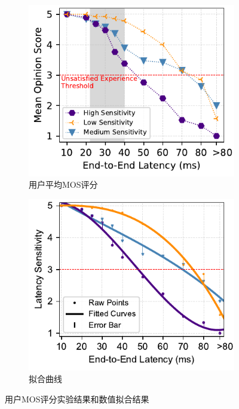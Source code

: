 \begin{figure}[ht]
\centering
\begin{subfigure}[t]{0.5\linewidth}
  \centering
  \includegraphics[width=\linewidth]{figures/chap03/latency_curve/user_perception.pdf}
  \caption{用户平均MOS评分}
  \label{fig-average-user-mos-rating}
\end{subfigure}%
\begin{subfigure}[t]{0.5\linewidth}
  \centering
  \includegraphics[width=\linewidth]{figures/chap03/latency_curve/fitted_curve.pdf}
  \caption{拟合曲线}
  \label{fig-fitted-curves}
\end{subfigure}
\caption{用户MOS评分实验结果和数值拟合结果}
\label{fig-latency-curve}
\end{figure}
